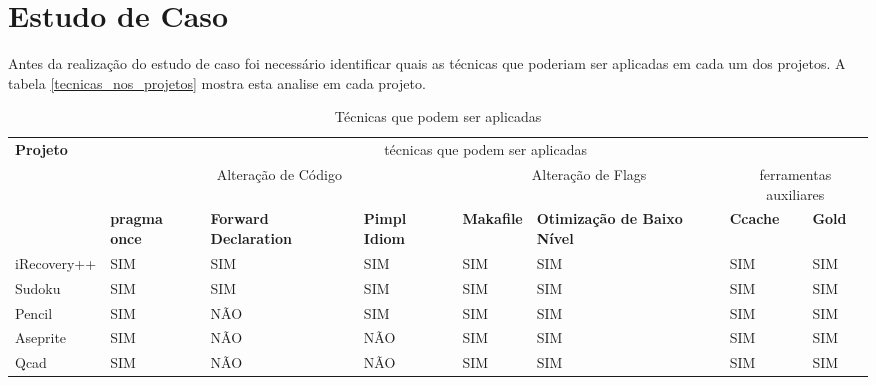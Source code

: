 \section {Estudo de Caso}

Antes da realização do estudo de caso foi necessário identificar quais
 as técnicas que poderiam ser aplicadas em cada um dos projetos.
 A tabela \ref{tecnicas_nos_projetos} mostra esta analise em cada projeto.


\begin{table}[h]
\tiny
\begin{tabular}{p{1cm}p{2cm}p{2cm}p{2cm}p{2cm}p{2cm}p{2cm}p{2cm}}
\toprule
\textbf{Projeto} & \multicolumn{7}{c}{técnicas que podem ser aplicadas} \\ 
 & \multicolumn{3}{c}{Alteração de Código} & \multicolumn{2}{c}{Alteração de Flags} & \multicolumn{2}{c}{ferramentas auxiliares}  \\ \midrule 
& \textbf{pragma once} & \textbf{Forward Declaration} & \textbf{Pimpl Idiom} & \textbf{Makafile} &
 \textbf{Otimização de Baixo Nível} & \textbf{Ccache} & \textbf{Gold} \\ \midrule
iRecovery++ & SIM & SIM & SIM &  SIM & SIM & SIM & SIM \\ \midrule
Sudoku &  SIM & SIM & SIM & SIM & SIM & SIM & SIM \\ \midrule
Pencil & SIM & NÃO &  SIM & SIM & SIM & SIM & SIM \\ \midrule
Aseprite &  SIM & NÃO & NÃO & SIM & SIM & SIM & SIM \\ \midrule
Qcad &  SIM & NÃO & NÃO & SIM & SIM & SIM & SIM \\ \bottomrule
\end{tabular} 
\caption{Técnicas que podem ser aplicadas}
\label{tecnicas_que_podem_ser_aplicadas}
\end{table}



